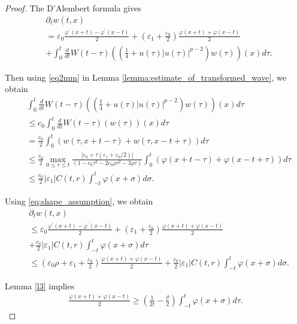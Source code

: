 \documentclass[reqno]{amsart}
\begin{document}
\begin{proof}
The D'Alembert formula gives
\begin{equation}
    \begin{aligned}
   &\partial_t w(t,x)\\
	&= \varepsilon_0 \frac{\varphi^\prime(x+t)- \varphi^\prime(x-t)}{2} 
	+ \left(\varepsilon_1 + \frac{\varepsilon_0}{2} \right) \frac{\varphi(x+t) + \varphi(x-t)}{2} \\
    & + \int_0^t \frac{d}{dt} W(t-\tau)\left( \left(\frac{1}{4}+u(\tau)|u(\tau)|^{p-2}\right) w(\tau) \right) (x) d\tau.
    \end{aligned}
\end{equation}

 
Then using \eqref{eq2mm} in  Lemma \ref{lemma:estimate_of_transformed_wave},
we obtain 
	\begin{align*}
	&\int_0^t \frac{d}{dt} W(t-\tau)\left( \left(\frac{1}{4}+u(\tau)|u(\tau)|^{p-2}\right) w(\tau) \right) (x) d\tau \\
	& \leq c_0 \int_0^t \frac{d}{dt} W(t-\tau) ( w(\tau) ) (x) d\tau \\
	&=  \frac{c_0}{2}\int_0^t \left(  w(\tau, x+t-\tau) +  w(\tau, x-t+\tau) \right) d\tau \\
	& \leq \frac{c_0}{2}\max_{0\leq \tau \leq t} \frac{ |\varepsilon_0 + \tau(\varepsilon_1 + \varepsilon_0/2)|}{(1-c_0 \tau^2-2c_0\rho \tau^2 - 3 \rho \tau)}
	\int_0^t \left(  \varphi(x+t-\tau) +  \varphi( x-t+\tau) \right) d\tau\\
	& \leq \frac{c_0}{2}| \varepsilon_1 | C(t,r) \int_{-t}^t  \varphi(x+\sigma) d\sigma.
	\end{align*}

Using  \eqref{eq:shape_assumption}, we obtain
	\begin{align*}
	&\partial_t w(t,x)\\
	&\leq \varepsilon_0 \frac{\varphi^\prime(x+t)- \varphi^\prime(x-t)}{2} 
	+ \left(\varepsilon_1 + \frac{\varepsilon_0}{2} \right) \frac{\varphi(x+t) + \varphi(x-t)}{2} \\
	& + \frac{c_0}{2} |\varepsilon_1| C(t,r) \int_{-t}^t  \varphi(x+\sigma) d\tau\\
	& \leq \left(\varepsilon_0 \rho + \varepsilon_1 + \frac{\varepsilon_0}{2}\right)\frac{\varphi(x+t) + \varphi(x-t)}{2}
	+ \frac{c_0}{2}| \varepsilon_1 | C(t,r)
	\int_{-t}^t  \varphi(x+\sigma) d\sigma.
	\end{align*}

Lemma \ref{l3} implies
	\begin{align}\label{eq.HH1m1}
	\frac{\varphi(x+t) + \varphi(x-t)}{2}
	\geq  \left( \frac{1}{2t} - \frac \rho 2 \right)
	\int_{-t}^t  \varphi(x+\sigma) d\tau. 
	\end{align}


\end{proof}
\end{document}
